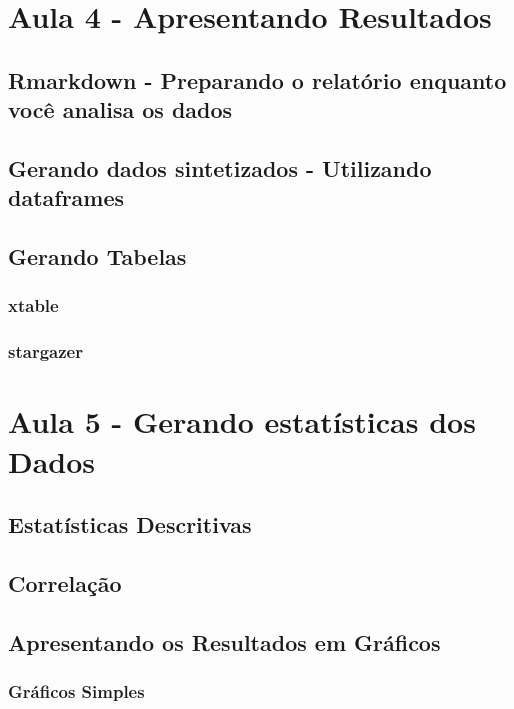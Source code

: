 \documentclass[12pt,a4paper,oneside]{erdc}\usepackage[]{graphicx}\usepackage[]{color}
\begin{document}
\chapter{Aula 4 - Apresentando Resultados}

	\section{Rmarkdown - Preparando o relatório enquanto você analisa os dados}
	
	\section{Gerando dados sintetizados - Utilizando dataframes}
	
	\section{Gerando Tabelas}
	
		\subsection{xtable}
		
		\subsection{stargazer}




\chapter{Aula 5 - Gerando estatísticas dos Dados}

	\section{Estatísticas Descritivas}
	
	\section{Correlação}
	
	\section{Apresentando os Resultados em Gráficos}
	
		\subsection{Gráficos Simples}
		
\end{document}

